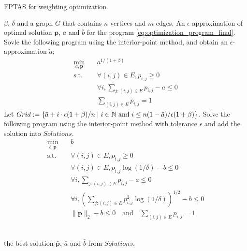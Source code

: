 \documentclass[letterpaper]{article} %
\newcommand{\probdistri}{\mathbf{p}}
\newcommand{\pair}[1]{(#1)}
\newcommand{\complexbound}{\beta}
\begin{document}
\begin{algorithm}[!htb] 
\caption{FPTAS for weighting optimization.} 
\label{alg:FPTAS} 
\begin{algorithmic}[1]
\Require 
$\beta$, $\delta$ and a graph $G$ that contains $n$ vertices and $m$ edges.
\Ensure 
An $\epsilon$-approximation of optimal solution $\bar{\probdistri{}}$, $\bar{a}$ and $\bar{b}$ for the program \eqref{eq:optimization_program_final}.
\State Sovle the following program using the interior-point method, and obtain an $\epsilon$-approximation $\tilde{a}$;
  \begin{equation}
    \label{eq:optimization_program_final_fix_b}
\begin{aligned}
    \min_{a,\probdistri{}} \quad&
    a^{1/(1+\complexbound{})}\\
    \mbox{s.t.} \quad &\forall \pair{i,j}\in E, p_{i,j}\ge 0 \\
    & \forall i, \sum_{j:\pair{i,j}\in E} p_{i,j} -a  \le 0\\
    & \sum_{\pair{i,j}\in E} p_{i,j}= 1
\end{aligned}
\end{equation}
\State Let $Grid:=\{\tilde{a}+i\cdot\epsilon(1+\beta)/n \mid  i\in \mathbb{N} \hbox{ and } i\le n(1-\tilde{a})/\epsilon(1+\beta)\}$. 
  \State Solve the following program using the interior-point method with tolerance $\epsilon$ and add the solution into $Solutions$.
  \begin{equation}
    \label{eq:optimization_program_final_fix_a}
\begin{aligned}
    \min_{b,\probdistri{}} \quad&
    b\\
    \mbox{s.t.} \quad &\forall \pair{i,j}\in E, p_{i,j}\ge 0 \\
    & \forall \pair{i,j}\in E, p_{i,j}\log(1/\delta) - b \le 0\\
    & \forall i, \sum_{j:\pair{i,j}\in E} p_{i,j} -a  \le 0\\
    & \forall i, \left(\sum_{j:\pair{i,j}\in E} p^2_{i,j}\log(1/\delta)\right)^{1/2} -b  \le 0\\
    & \|\probdistri{}\|_2 -b \le 0 \quad \mbox{and} \quad \sum_{\pair{i,j}\in E} p_{i,j}= 1
\end{aligned}
\end{equation}

\EndFor\\
\Return the best solution $\bar{\probdistri{}}$, $\bar{a}$ and $\bar{b}$ from $Solutions$. 
\end{algorithmic}
\end{algorithm}
\end{document}
